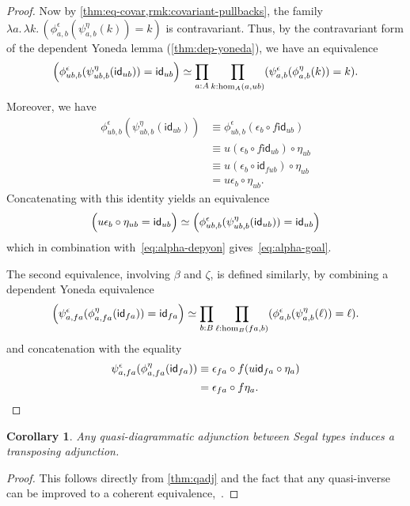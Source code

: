 \documentclass[12pt]{amsart}
\theoremstyle{plain}
\newtheorem{cor}[thm]{Corollary}
\theoremstyle{definition}
\theoremstyle{remark}
\numberwithin{equation}{section}
\newcommand{\jdeq}{\equiv}
\newcommand{\lam}[1]{\lambda #1.\,}
\newcommand{\idarr}[1]{\mathsf{id}_{#1}}
\newcommand{\Parens}[1]{\Bigl(#1\Bigr)}
\begin{document}
\begin{proof}
  Now by \cref{thm:eq-covar,rmk:covariant-pullbacks}, the family $\lam{a}\lam{k} (\phi^\epsilon_{a,b}(\psi^\eta_{a,b}(k)) = k)$ is contravariant.
  Thus, by the contravariant form of the dependent Yoneda lemma (\cref{thm:dep-yoneda}), we have an equivalence
  \begin{equation}
    \Parens{\phi^\epsilon_{ub,b}(\psi^\eta_{ub,b}(\idarr{ub})) = \idarr{ub}}
    \simeq  \prod_{a:A} \prod_{k:\hom_A(a,ub)} (\psi^\epsilon_{a,b}(\phi^\eta_{a,b}(k)) = k).\label{eq:alpha-depyon}
  \end{equation}
  Moreover, we have
  \begin{align*}
    \phi^\epsilon_{ub,b}(\psi^\eta_{ub,b}(\idarr{ub}))
    &\jdeq \phi^\epsilon_{ub,b}(\epsilon_b \circ f\idarr{ub})\\
    &\jdeq u(\epsilon_b \circ f\idarr{ub}) \circ \eta_{ub}\\
    &\jdeq u(\epsilon_b \circ \idarr{fub}) \circ \eta_{ub}\\
    &= u\epsilon_b \circ \eta_{ub}.
  \end{align*}
  Concatenating with this identity yields an equivalence
  \[ \Parens{u \epsilon_b \circ \eta_{ub} = \idarr{ub}} \simeq \Parens{\phi^\epsilon_{ub,b}(\psi^\eta_{ub,b}(\idarr{ub})) = \idarr{ub}} \]
  which in combination with~\eqref{eq:alpha-depyon} gives~\eqref{eq:alpha-goal}.

  The second equivalence, involving $\beta$ and $\zeta$, is defined similarly, by combining a dependent Yoneda equivalence
  \begin{equation*}
    \Parens{\psi^\epsilon_{a,fa}(\phi^\eta_{a,fa}(\idarr{fa})) = \idarr{fa}}
    \simeq  \prod_{b:B} \prod_{\ell:\hom_B(fa,b)} (\phi^\epsilon_{a,b}(\psi^\eta_{a,b}(\ell)) = \ell).\label{eq:beta-depyon}
  \end{equation*}
  and concatenation with the equality
  \begin{align*}
    \psi^\epsilon_{a,fa}(\phi^\eta_{a,fa}(\idarr{fa}))
    &\jdeq \epsilon_{fa} \circ f(u\idarr{fa} \circ \eta_a)\\
    &= \epsilon_{fa} \circ f\eta_a.\qedhere
  \end{align*}
\end{proof}

\begin{cor}\label{thm:qadj-transp}
  Any quasi-diagrammatic adjunction between Segal types induces a transposing adjunction.
\end{cor}
\begin{proof}
  This follows directly from \cref{thm:qadj} and the fact that any quasi-inverse can be improved to a coherent equivalence,~\cite[Theorem 4.2.3]{hottbook}.
\end{proof}
\end{document}
